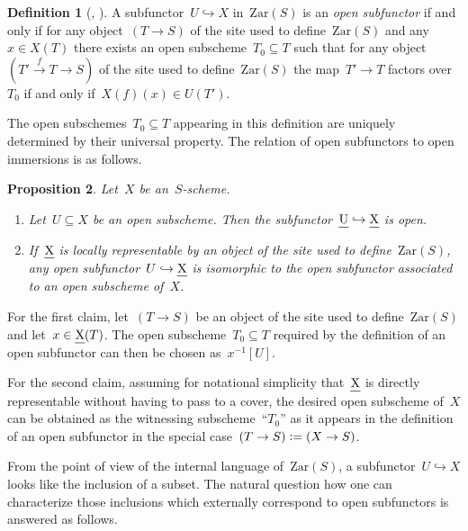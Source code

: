 \documentclass[10pt,reqno,a4paper]{amsbook}
\makeatletter
\theoremstyle{definition}
\newtheorem{defn}{Definition}[section]
\theoremstyle{plain}
\newtheorem{prop}[defn]{Proposition}
\theoremstyle{remark}
\let\oldul\ul
\renewcommand{\ul}[1]{\text{\oldul{$#1$}}}
\newcommand{\Zar}{\mathrm{Zar}}
\newcommand{\?}{\,{:}\,}
\renewcommand{\_}{\mathpunct{.}\,}
\newcommand{\xra}{\xrightarrow}
\newcommand{\defeq}{\vcentcolon=}
\renewenvironment{proof}[1][\proofname]{\par
  \pushQED{\qed}%
  \normalfont \topsep6\p@\@plus6\p@\relax
  \trivlist
  \item[\hskip\labelsep
        \itshape
    #1\@addpunct{.}]\ignorespaces
}{%
  \popQED\endtrivlist\@endpefalse
}
\makeatother
\begin{document}
\begin{defn}[{\cite[Définition~I.1.3.6 on page~10]{demazure:gabriel},
\cite[Tag~01JI]{stacks-project}}]
A subfunctor~$U \hookrightarrow X$ in~$\Zar(S)$ is an \emph{open subfunctor} if
and only if for any object~$(T \to S)$ of the site used to define~$\Zar(S)$
and any~$x \in X(T)$ there exists an open subscheme~$T_0 \subseteq T$
such that for any object~$(T' \xra{f} T \to S)$ of the site used to
define~$\Zar(S)$ the map~$T' \to T$ factors over~$T_0$ if and only if~$X(f)(x)
\in U(T')$.
\end{defn}

The open subschemes~$T_0 \subseteq T$ appearing in this definition are uniquely
determined by their universal property. The relation of open subfunctors to
open immersions is as follows.

\begin{prop}\label{prop:char-open-immersion}
Let~$X$ be an~$S$-scheme.
\begin{enumerate}
\item Let~$U \subseteq X$ be an open subscheme. Then the subfunctor~$\ul{U}
\hookrightarrow \ul{X}$ is open.
\item If~$\ul{X}$ is locally representable by an object of the site used to
define~$\Zar(S)$, any open subfunctor~$U \hookrightarrow \ul{X}$ is isomorphic
to the open subfunctor associated to an open subscheme of~$X$.
\end{enumerate}
\end{prop}

\begin{proof}For the first claim, let~$(T \to S)$ be an object of the site used
to define~$\Zar(S)$ and let~$x \in \ul{X}(T)$. The open
subscheme~$T_0 \subseteq T$ required by the definition of an open subfunctor can
then be chosen as~$x^{-1}[U]$.

For the second claim, assuming for notational simplicity that~$\ul{X}$ is
directly representable without having to pass to a cover, the desired open
subscheme of~$X$ can be obtained as the witnessing subscheme~``$T_0$'' as it
appears in the definition of an open subfunctor in the special case~$(T \to S)
\defeq (X \to S)$.
\end{proof}

From the point of view of the internal language of~$\Zar(S)$, a subfunctor~$U
\hookrightarrow X$ looks like the inclusion of a subset. The natural question
how one can characterize those inclusions which externally correspond to open
subfunctors is answered as follows.
\end{document}
